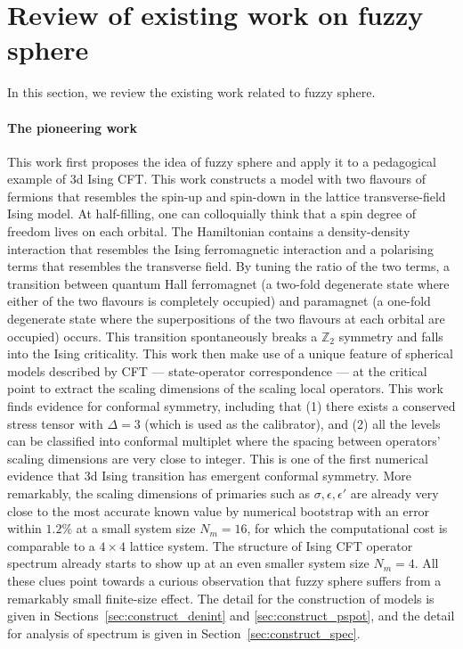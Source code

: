 \documentclass{timesjhep}
\begin{document}
\section{Review of existing work on fuzzy sphere}
\label{sec:review}

In this section, we review the existing work related to fuzzy sphere. 

\paragraph{The pioneering work~\cite{Zhu2022}}

This work first proposes the idea of fuzzy sphere and apply it to a pedagogical example of 3d Ising CFT. This work constructs a model with two flavours of fermions that resembles the spin-up and spin-down in the lattice transverse-field Ising model. At half-filling, one can colloquially think that a spin degree of freedom lives on each orbital. The Hamiltonian contains a density-density interaction that resembles the Ising ferromagnetic interaction and a polarising terms that resembles the transverse field. By tuning the ratio of the two terms, a transition between quantum Hall ferromagnet (a two-fold degenerate state where either of the two flavours is completely occupied) and paramagnet (a one-fold degenerate state where the superpositions of the two flavours at each orbital are occupied) occurs. This transition spontaneously breaks a $\mathbb{Z}_2$ symmetry and falls into the Ising criticality. This work then make use of a unique feature of spherical models described by CFT --- state-operator correspondence --- at the critical point to extract the scaling dimensions of the scaling local operators. This work finds evidence for conformal symmetry, including that (1) there exists a conserved stress tensor with $\Delta=3$ (which is used as the calibrator), and (2) all the levels can be classified into conformal multiplet where the spacing between operators' scaling dimensions are very close to integer. This is one of the first numerical evidence that 3d Ising transition has emergent conformal symmetry. More remarkably, the scaling dimensions of primaries such as $\sigma,\epsilon,\epsilon'$ are already very close to the most accurate known value by numerical bootstrap with an error within $1.2\%$ at a small system size $N_m=16$, for which the computational cost is comparable to a $4\times4$ lattice system. The structure of Ising CFT operator spectrum already starts to show up at an even smaller system size $N_m=4$. All these clues point towards a curious observation that fuzzy sphere suffers from a remarkably small finite-size effect. The detail for the construction of models is given in Sections~\ref{sec:construct_denint} and \ref{sec:construct_pspot}, and the detail for analysis of spectrum is given in Section~\ref{sec:construct_spec}.
\end{document}
